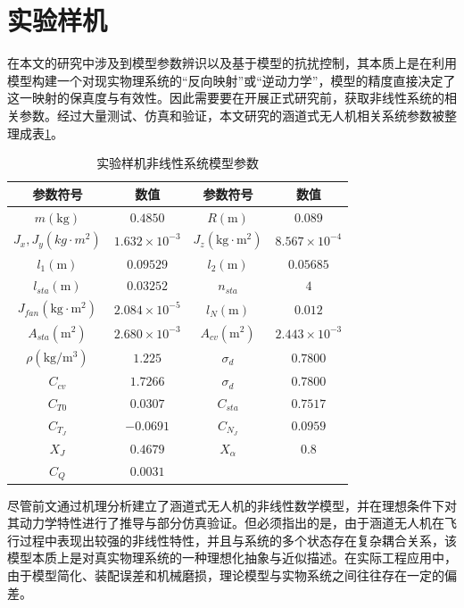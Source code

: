 \section{实验样机}
\label{sec:sample_uav}
在本文的研究中涉及到模型参数辨识以及基于模型的抗扰控制，其本质上是在利用模型构建一个对现实物理系统的“反向映射”或“逆动力学”，模型的精度直接决定了这一映射的保真度与有效性。因此需要要在开展正式研究前，获取非线性系统的相关参数。经过大量测试、仿真和验证，本文研究的涵道式无人机相关系统参数被整理成表\ref{tab:params}。
\begin{table}
    \caption{\label{tab:params}实验样机非线性系统模型参数}
    \centering{}%
    \begin{tabular}{cccc}
    \toprule
    参数符号 & 数值 & 参数符号 & 数值\tabularnewline

    \midrule 
    $m\mathrm{(kg)}$ & $0.4850$ & $R\mathrm{(m)}$ & $0.089$\tabularnewline

    $J_x,J_y(kg \cdot m^2)$ & $1.632 \times 10^{-3}$ & $J_z\mathrm{(kg \cdot m^2)}$ & $8.567 \times 10^{-4}$\tabularnewline

    $l_1\mathrm{(m)}$ & $0.09529$ & $l_2\mathrm{(m)}$ & $0.05685$\tabularnewline

    $l_{sta}\mathrm{(m)}$ & $0.03252$ & $n_{sta}$ & $4$\tabularnewline

    $J_{fan}\mathrm{(kg \cdot m^2)}$ & $2.084 \times 10^{-5}$ & $l_N\mathrm{(m)}$ & $0.012$\tabularnewline

    $A_{sta}\mathrm{(m^2)}$ & $2.680 \times 10^{-3}$ & $A_{cv}\mathrm{(m^2)}$ & $2.443 \times 10 ^{-3}$\tabularnewline

    $\rho \mathrm{(kg/m^3)}$ & $1.225$ & $\sigma _d$ & $0.7800$\tabularnewline

    $C_{cv} $ & $1.7266$ & $\sigma _d$ & $0.7800$\tabularnewline
    
    $C_{T0}$ & $ 0.0307$ & $C_{sta}$ & $0.7517$\tabularnewline
    
    $C_{T_{J}}$ & $−0.0691$ & $C_{N_{J}}$ & $0.0959$\tabularnewline
    
    $X_J$ & $0.4679$ & $X_{\alpha}$ & $0.8$\tabularnewline
    
    $C_{Q}$ & $0.0031$\tabularnewline
    \bottomrule
    \end{tabular}
\end{table}

尽管前文通过机理分析建立了涵道式无人机的非线性数学模型，并在理想条件下对其动力学特性进行了推导与部分仿真验证。但必须指出的是，由于涵道无人机在飞行过程中表现出较强的非线性特性，并且与系统的多个状态存在复杂耦合关系，该模型本质上是对真实物理系统的一种理想化抽象与近似描述。在实际工程应用中，由于模型简化、装配误差和机械磨损，理论模型与实物系统之间往往存在一定的偏差。

